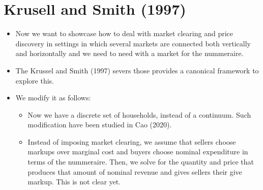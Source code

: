 \documentclass[11pt]{article}
\numberwithin{equation}{section}
\begin{document}
\section{Krusell and Smith (1997)}

\begin{itemize}
	\item Now we want to showcase how to deal with market clearing and price discovery in settings in which several markets are connected both vertically and horizontally and we need to need with a market for the nummeraire.
	
	\item The Krussel and Smith (1997) severs those provides a canonical framework to explore this. 
	
	\item We modify it as follows:
	
	\begin{itemize}
		\item Now we have a discrete set of households, instead of a continuum. Such modification have been studied in Cao (2020). 
		
		\item Instead of imposing market clearing, we assume that sellers choose markups over marginal cost and buyers choose nominal expenditure in terms of the nummeraire. Then, we solve for the quantity and price that produces that amount of nominal revenue and gives sellers their give markup. This is not clear yet. 
		
		
	\end{itemize}

\end{itemize}

	
\end{document}
